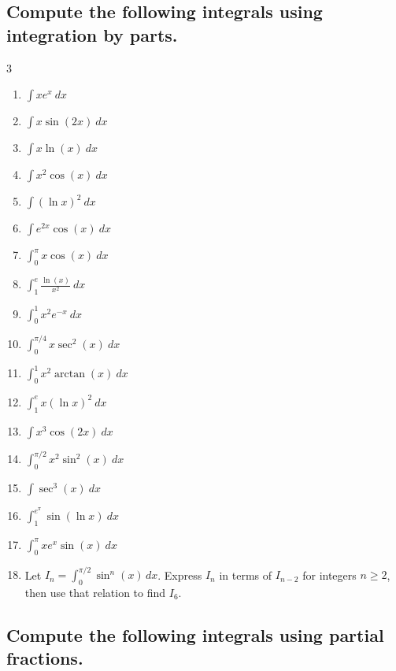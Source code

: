 \documentclass{article}
\begin{document}
\newpage
\subsection{Compute the following integrals using integration by parts.}

\begin{multicols}{3}
\begin{enumerate}
\item $\displaystyle \int x e^x\ dx$
\item $\displaystyle \int x\sin(2x)\ dx$
\item $\displaystyle \int x\ln(x)\ dx$
\item $\displaystyle \int x^2\cos(x)\ dx$
\item $\displaystyle \int (\ln x)^2\ dx$
\item $\displaystyle \int e^{2x}\cos(x)\ dx$
\item $\displaystyle \int_0^{\pi} x\cos(x)\ dx$
\item $\displaystyle \int_1^e \frac{\ln(x)}{x^2}\ dx$
\item $\displaystyle \int_0^1 x^2 e^{-x}\ dx$
\item $\displaystyle \int_0^{\pi/4} x\sec^2(x)\ dx$
\item $\displaystyle \int_0^1 x^2\arctan(x)\ dx$
\item $\displaystyle \int_1^e x(\ln x)^2\ dx$
\item $\displaystyle \int x^3\cos(2x)\ dx$
\item $\displaystyle \int_0^{\pi/2} x^2\sin^2(x)\ dx$
\item $\displaystyle \int \sec^3(x)\ dx$
\item $\displaystyle \int_1^{e^\pi} \sin(\ln x)\ dx$
\item $\displaystyle \int_0^\pi xe^x\sin(x)\ dx$
\item Let $I_n=\int_0^{\pi/2}\sin^n(x)\,dx$. Express $I_n$ in terms of $I_{n-2}$ for integers $n\geq 2$, then use that relation to find $I_6$.
\end{enumerate}
\end{multicols}

\subsection{Compute the following integrals using partial fractions.}
\end{document}
